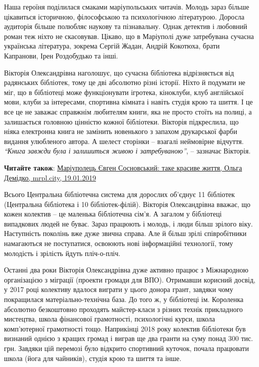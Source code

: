 Наша героїня поділилася смаками маріупольських читачів. Молодь зараз більше
цікавиться історичною, філософською та психологічною літературою. Доросла
аудиторія більше полюбляє наукову та пізнавальну. Однак детектив і любовний
роман теж ніхто не скасовував. Цікаво, що в Маріуполі дуже затребувана сучасна
українська література, зокрема Сергій Жадан, Андрій Кокотюха, брати Капранови,
Ірен Роздобудько та інші.


Вікторія Олександрівна наголошує, що сучасна бібліотека відрізняється від
радянських бібліотек, тому це дві абсолютно різні історії. Ніхто й подумати не
міг, що в бібліотеці може функціонувати ігротека, кіноклуби, клуб англійської
мови, клуби за інтересами, спортивна кімната і навіть студія крою та шиття. І
це все це не заважає справжнім любителям книги, яка не просто стоїть на полиці,
а залишається головною цінністю кожної бібліотеки. Вікторія підкреслила, що
ніяка електронна книга не замінить новенького з запахом друкарської фарби
видання улюбленого автора. А шелест сторінки – взагалі неймовірне відчуття.
\emph{\enquote{Книга завжди була і залишиться живою і затребуваною}}, – зазначає Вікторія.

\textbf{Читайте також}: \href{https://mrpl.city/blogs/view/mariupolets-evgen-sosnovskij-take-krasive-zhittya}{%
Маріуполець Євген Сосновський: таке красиве життя, %
Ольга Демідко, mrpl.city, 19.01.2019}

Всього Центральна бібліотечна система для дорослих об'єднує 11 бібліотек
(Центральна бібліотека і 10 бібліотек-філій). Вікторія Олександрівна вважає, що
кожен колектив – це маленька бібліотечна сім'я. А загалом у бібліотеці
випадкових людей не буває. Зараз працюють і молодь, і люди більш зрілого віку.
Наступність поколінь вже дуже звична справа. Але й більш зрілі співробітники
намагаються не поступатися, освоюють нові інформаційні технології, тому
молодість і зрілість йдуть пліч-о-пліч.


Останні два роки Вікторія Олександрівна дуже активно працює з Міжнародною
організацією з міграції (проекти громади для ВПО). Отримавши корисний досвід, у
2017 році колективу вдалося виграти у цього донора грант, завдяки чому
покращилася матеріально-технічна база. До того ж, у бібліотеці ім. Короленка
абсолютно безкоштовно проходять майстер-класи з різних технік прикладного
мистецтва, школа фінансової грамотності, психологічні курси, школа комп'ютерної
грамотності тощо. Наприкінці 2018 року колектив бібліотеки був визнаний однією
з кращих громад і виграв ще два гранти на суму понад 300 тис. грн. Завдяки цій
перемозі було відкрито спортивний куточок, почала працювати школа (йога для
чайників), студія крою та шиття та інше.

